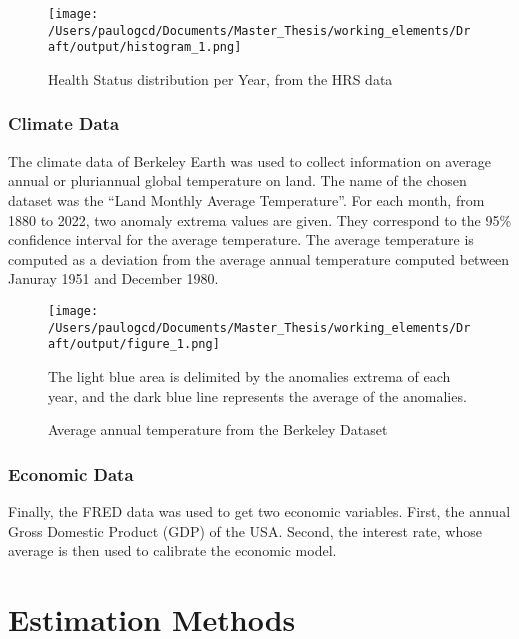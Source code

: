 \documentclass{article}
\begin{document}
\begin{figure}[H]
    \texttt{[image: /Users/paulogcd/Documents/Master\_Thesis/working\_elements/Draft/output/histogram\_1.png]}
    \caption{Health Status distribution per Year, from the HRS data}
    
    
\end{figure}

\subsubsection{Climate Data}

The climate data of Berkeley Earth was used to collect information
on average annual or pluriannual global temperature on land.
The name of the chosen dataset was the ``Land Monthly Average Temperature''. 
For each month, from 1880 to 2022, two anomaly extrema values are given. 
They correspond to the 95\% confidence interval for the
average temperature. 
The average temperature is computed as a deviation from the average annual 
temperature computed between Januray 1951 and December 1980. 

\begin{figure}[H]
    \texttt{[image: /Users/paulogcd/Documents/Master\_Thesis/working\_elements/Draft/output/figure\_1.png]}
    \caption{Average annual temperature from the Berkeley Dataset}
    
    The light blue area is delimited by the anomalies extrema of each year, and
    the dark blue line represents the average of the anomalies.
\end{figure}

\subsubsection{Economic Data}

Finally, the FRED data was used to get two economic variables. 
First, the annual Gross Domestic Product (GDP) of the USA. 
Second, the interest rate, whose average is then used to calibrate the economic model.

\section{Estimation Methods}
\end{document}
